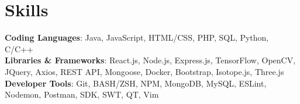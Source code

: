 \documentclass[a4paper,11pt]{article}
\begin{document}
\section{Skills}
 \vspace{0pt}
 \begin{itemize}[leftmargin=0.5cm, label={}]
    \small{\item
     {\textbf{Coding Languages}}{: Java, JavaScript, HTML/CSS, PHP, SQL, Python, C/C++} \\
     {\textbf{Libraries \& Frameworks}}{: React.js, Node.js, Express.js, TensorFlow, OpenCV, JQuery, Axios, REST API, Mongoose, Docker, Bootstrap, Isotope.js, Three.js \\
     {\textbf{Developer Tools}}{: Git, BASH/ZSH, NPM, MongoDB, MySQL, ESLint, Nodemon, Postman, SDK, SWT, QT, Vim} \\
    }}
 \end{itemize}

\end{document}
